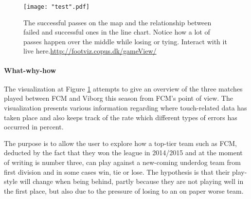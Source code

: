 \documentclass[Report.tex]{subfiles}
\begin{document}
 

\begin{figure}
	\center
	\texttt{[image: "test".pdf]}
	\caption{The successful passes on the map and the relationship between failed and successful ones in the line chart. Notice how a lot of passes happen over the middle while losing or tying. Interact with it live here.\url{http://footviz.copus.dk/gameView/}}
	\label{Fig:viz}
\end{figure}


\paragraph{What-why-how \\}
The visualization at Figure \ref{Fig:viz} attempts to give an overview of the three matches played between FCM and Viborg this season from FCM's point of view. The visualization presents various information regarding where touch-related data has taken place and also keeps track of the rate which different types of errors has occurred in percent.

The purpose is to allow the user to explore how a top-tier team such as FCM, deducted by the fact that they won the league in 2014/2015 and at the moment of writing is number three, can play against a new-coming underdog team from first division and in some cases win,  tie or lose. The hypothesis is that their play-style will change when being behind, partly because they are not playing well in the first place, but also due to the pressure of losing to an on paper worse team.\\
\end{document}
